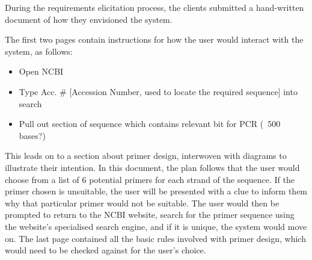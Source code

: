 During the requirements elicitation process, the clients submitted a hand-written document of how they envisioned the system. 

The first two pages contain instructions for how the user would interact with the system, as follows:
\begin{itemize}
\item{Open NCBI}
\item{Type Acc. \# [Accession Number, used to locate the required sequence] into search}
\item{Pull out section of sequence which contains relevant bit for PCR (~500 bases?)}
\end{itemize}
This leads on to a section about primer design, interwoven with diagrams to illustrate their intention. In this document, the plan follows that the user would choose from
a list of 6 potential primers for each strand of the sequence. If the primer chosen is unsuitable, the user will be presented with a clue to inform them why that particular
primer would not be suitable. 
The user would then be prompted to return to the NCBI website, search for the primer sequence using the website's specialised search engine, and if it is unique, 
the system would move on.
The last page contained all the basic rules involved with primer design, which would need to be checked against for the user's choice.